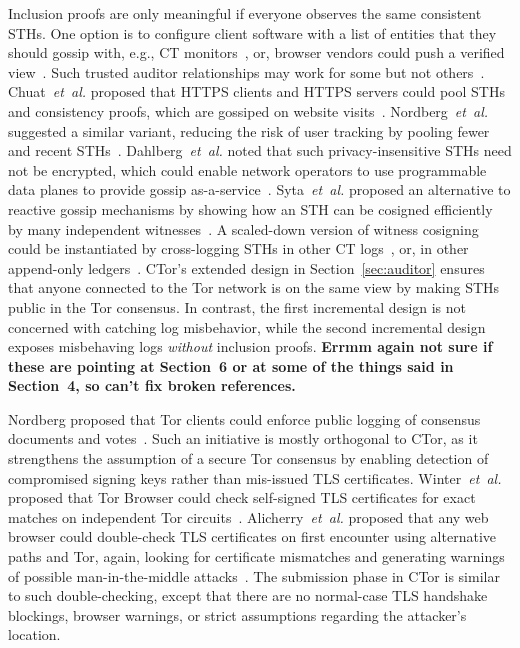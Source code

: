 Inclusion proofs are only meaningful if everyone observes the same consistent
STHs. One option is to configure client software with a list of entities that
they should gossip with, e.g., CT monitors~\cite{chase}, or, browser vendors
could push a verified view~\cite{sth-push}. Such trusted auditor relationships
may work for some but not others~\cite{nordberg}. Chuat~\emph{et~al.} proposed
that HTTPS clients and HTTPS servers could pool STHs and consistency proofs,
which are gossiped on website visits~\cite{chuat}. Nordberg~\emph{et~al.}
suggested a similar variant, reducing the risk of user tracking by pooling fewer
and recent STHs~\cite{nordberg}. Dahlberg~\emph{et~al.} noted that such
privacy-insensitive STHs need not be encrypted, which could enable network
operators to use programmable data planes to provide gossip
as-a-service~\cite{dahlberg}. Syta~\emph{et~al.} proposed an alternative to
reactive gossip mechanisms by showing how an STH can be cosigned efficiently by
many independent witnesses~\cite{syta}. A scaled-down version of witness
cosigning could be instantiated by cross-logging STHs in other CT
logs~\cite{minimal-gossip}, or, in other append-only ledgers~\cite{catena}.
CTor's extended design in Section~\ref{sec:auditor} ensures that anyone
connected to the Tor network is on the same view by making STHs public in the
Tor consensus.  In contrast, the first incremental design is not concerned with
catching log misbehavior, while the second incremental design exposes
misbehaving logs \emph{without} inclusion proofs.
{\bf \color{red} Errmm again not sure if these are pointing at Section~6
or at some of the things said in Section~4, so can't fix broken references.}

Nordberg proposed that Tor clients could enforce public logging of consensus
documents and votes~\cite{consensus-transparency}.  Such an initiative is
mostly orthogonal to CTor, as it strengthens the assumption of a secure Tor
consensus by enabling detection of compromised signing keys rather than
mis-issued TLS certificates.  Winter~\emph{et~al.} proposed that Tor Browser
could check self-signed TLS certificates for exact matches on independent Tor
circuits~\cite{spoiled-onions}.  Alicherry~\emph{et~al.} proposed that any web browser could
double-check TLS certificates on first encounter using alternative paths and
Tor, again, looking for certificate mismatches and generating warnings of
possible man-in-the-middle attacks~\cite{doublecheck}.  The submission phase in
CTor is similar to such double-checking, except that there are no
normal-case TLS handshake blockings, browser warnings, or strict
assumptions regarding the attacker's location.
